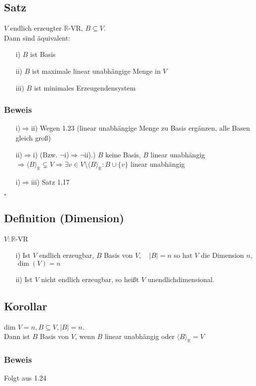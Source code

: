 \documentclass[12pt,titlepage, pdf]{article}
\newcommand{\R}{\mathds{R}}
\newcommand{\vecspace}[2]{\langle#1\rangle_{#2}}
\newcommand{\vecspaceR}[1]{\vecspace{#1}{\R}}
\renewcommand{\>}{\rightarrow}
\renewcommand{\*}{\cdot}
\begin{document}
\subsection{Satz}
$V$ endlich erzeugter $\R$-VR, $B\subseteq V$.\\
Dann sind äquivalent:
\begin{itemize}
	\item[i)] $B$ ist Basis
	\item[ii)] $B$ ist maximale linear unabhängige Menge in $V$
	\item[iii)] $B$ ist minimales Erzeugendensystem
\end{itemize}
\subsubsection*{Beweis}
\begin{itemize}
	\item[i)$\Rightarrow$ii)] Wegen 1.23 (linear unabhängige Menge zu Basis ergänzen, alle Basen gleich groß)
	\item[ii)$\Rightarrow$i)] (Bzw. $\neg$i)$\Rightarrow\neg$ii).) $B$ keine Basis, $B$ linear unabhängig\\
	 $\Rightarrow\langle B\rangle_\R\subsetneq V\Rightarrow\exists v\in V\setminus\langle B\rangle_\R\colon B\cup\{v\}$ linear unabhängig
	\item[i)$\Rightarrow$iii)] Satz 1.17 
\end{itemize}\hfill$\square$
\subsection{Definition (Dimension)}
$V: \R $-VR\\
\begin{itemize}
	\item[i)] Ist $V$ endlich erzeugbar, $B$ Basis von $V,\quad|B| = n$ so hat $V$ die Dimension $n$, $\dim(V) = n$
	\item[ii)] Ist $V$ nicht endlich erzeugbar, so heißt $V$ unendlichdimensional. 
\end{itemize}
\subsection{Korollar}
dim $V = n, B \subseteq V, |B| = n$.\\
Dann ist $B$ Basis von $V$, wenn $B$ linear unabhängig oder $\vecspaceR{B} = V$
\subsubsection*{Beweis} Folgt aus 1.24
\end{document}
